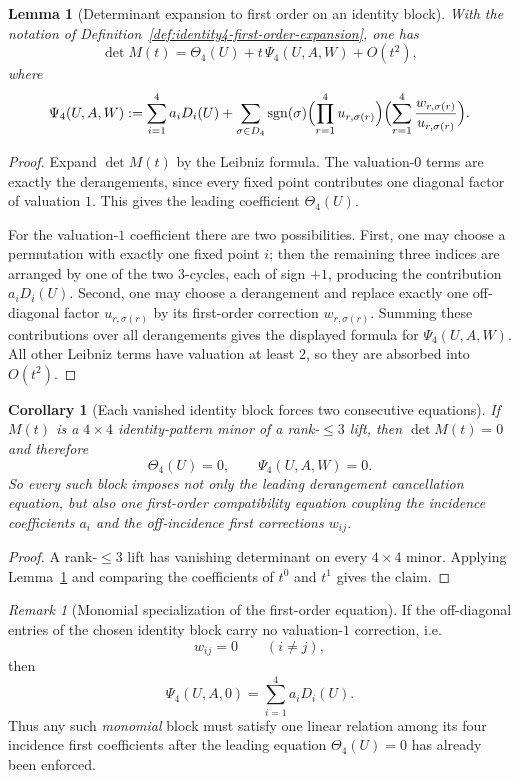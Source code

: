\documentclass[11pt]{amsart}
\numberwithin{equation}{section}
\theoremstyle{plain}
\newtheorem{lemma}[theorem]{Lemma}
\newtheorem{corollary}[theorem]{Corollary}
\theoremstyle{definition}
\theoremstyle{remark}
\newtheorem{remark}[theorem]{Remark}
\begin{document}
\begin{lemma}[Determinant expansion to first order on an identity block]
\label{lem:identity4-determinant-first-order}
With the notation of Definition~\ref{def:identity4-first-order-expansion}, one has
\[
\det M(t)=\Theta_4(U)+t\,\Psi_4(U,A,W)+O(t^2),
\]
where
\[
\Psi_4(U,A,W)
:=
\sum_{i=1}^4 a_i D_i(U)
+
\sum_{\sigma\in D_4}\operatorname{sgn}(\sigma)
\Bigl(\prod_{r=1}^4 u_{r,\sigma(r)}\Bigr)
\Bigl(\sum_{r=1}^4 \frac{w_{r,\sigma(r)}}{u_{r,\sigma(r)}}\Bigr).
\]
\end{lemma}

\begin{proof}
Expand $\det M(t)$ by the Leibniz formula.
The valuation-$0$ terms are exactly the derangements, since every fixed point contributes one diagonal factor of valuation $1$.
This gives the leading coefficient $\Theta_4(U)$.

For the valuation-$1$ coefficient there are two possibilities.
First, one may choose a permutation with exactly one fixed point $i$; then the remaining three indices are arranged by one of the two $3$-cycles, each of sign $+1$, producing the contribution $a_iD_i(U)$.
Second, one may choose a derangement and replace exactly one off-diagonal factor $u_{r,\sigma(r)}$ by its first-order correction $w_{r,\sigma(r)}$.
Summing these contributions over all derangements gives the displayed formula for $\Psi_4(U,A,W)$.
All other Leibniz terms have valuation at least $2$, so they are absorbed into $O(t^2)$.
\end{proof}

\begin{corollary}[Each vanished identity block forces two consecutive equations]
\label{cor:identity4-two-equation-package}
If $M(t)$ is a $4\times4$ identity-pattern minor of a rank-$\le 3$ lift, then $\det M(t)=0$ and therefore
\[
\Theta_4(U)=0,
\qquad
\Psi_4(U,A,W)=0.
\]
So every such block imposes not only the leading derangement cancellation equation, but also one first-order compatibility equation coupling the incidence coefficients $a_i$ and the off-incidence first corrections $w_{ij}$.
\end{corollary}

\begin{proof}
A rank-$\le 3$ lift has vanishing determinant on every $4\times4$ minor.
Applying Lemma~\ref{lem:identity4-determinant-first-order} and comparing the coefficients of $t^0$ and $t^1$ gives the claim.
\end{proof}

\begin{remark}[Monomial specialization of the first-order equation]
\label{rem:identity4-monomial-specialization}
If the off-diagonal entries of the chosen identity block carry no valuation-$1$ correction, i.e.
\[
 w_{ij}=0\qquad(i\neq j),
\]
then
\[
\Psi_4(U,A,0)=\sum_{i=1}^4 a_iD_i(U).
\]
Thus any such \emph{monomial} block must satisfy one linear relation among its four incidence first coefficients after the leading equation $\Theta_4(U)=0$ has already been enforced.
\end{remark}
\end{document}
